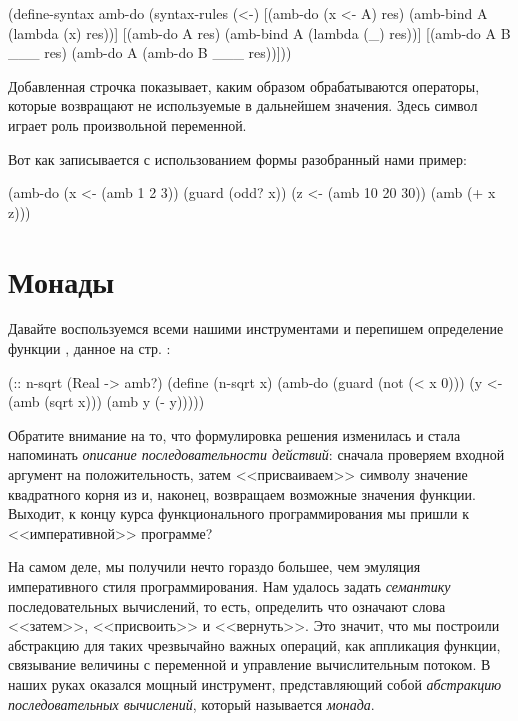 \begin{Definition}[emph={x,A,res,B}]
(define-syntax amb-do
  (syntax-rules (<-) 
    [(amb-do (x <- A) res) (amb-bind A (lambda (x) res))]
    [(amb-do A res)        (amb-bind A (lambda (_) res))]
    [(amb-do A B ___ res)  (amb-do A (amb-do B ___ res))]))
\end{Definition}

Добавленная строчка показывает, каким образом обрабатываются операторы, которые возвращают не используемые в дальнейшем значения. Здесь символ \s{_} играет роль произвольной переменной.

Вот как записывается с использованием формы  разобранный нами пример:

\begin{SchemeCode}
(amb-do
  (x <- (amb 1 2 3))
  (guard (odd? x))
  (z <- (amb 10 20 30))
  (amb (+ x z)))
\end{SchemeCode}

\section[2]{Монады}%
Давайте воспользуемся всеми нашими инструментами и перепишем определение функции , данное на стр. \pageref{n-sqrt}:
\begin{SchemeCode}[emph={x,y}]
(:: n-sqrt (Real -> amb?)
  (define (n-sqrt x)
    (amb-do (guard (not (< x 0)))
            (y <- (amb (sqrt x)))
            (amb y (- y)))))
\end{SchemeCode}

Обратите внимание на то, что формулировка решения изменилась и стала напоминать \emph{описание последовательности действий}: сначала проверяем входной аргумент  на положительность, затем <<присваиваем>> символу  значение квадратного корня из  и, наконец, возвращаем возможные значения функции. Выходит, к концу курса функционального программирования мы  пришли к <<императивной>> программе? 

На самом деле, мы получили нечто гораздо большее, чем эмуляция императивного стиля программирования. Нам удалось задать \emph{семантику} последовательных вычислений, то есть, определить что означают слова <<затем>>, <<присвоить>> и <<вернуть>>. Это значит, что мы построили абстракцию для таких чрезвычайно важных операций, как  аппликация функции, связывание величины с переменной и управление вычислительным потоком. В наших руках оказался мощный инструмент, представляющий собой \emph{абстракцию последовательных вычислений}, который называется \emph{монада}. 

